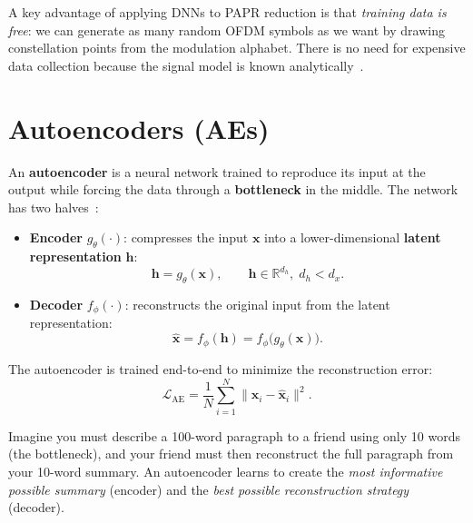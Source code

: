 \begin{keyinsight}
    A key advantage of applying DNNs to PAPR reduction is that
    \emph{training data is free}: we can generate as many random
    OFDM symbols as we want by drawing constellation points from
    the modulation alphabet.  There is no need for expensive data
    collection because the signal model is known analytically~\cite{da2024survey}.
\end{keyinsight}


\section{Autoencoders (AEs)}
\label{sec:autoencoders}

An \textbf{autoencoder} is a neural network trained to reproduce its input
at the output while forcing the data through a \textbf{bottleneck} in the
middle.  The network has two halves~\cite{da2024survey,kim2017novel}:

\begin{itemize}
    \item \textbf{Encoder} $g_\theta(\cdot)$:
          compresses the input $\bm{x}$ into a lower-dimensional
          \textbf{latent representation} $\bm{h}$:
          \begin{equation}
              \bm{h} = g_\theta(\bm{x}),
              \qquad \bm{h} \in \mathbb{R}^{d_h},\; d_h < d_x.
              \label{eq:encoder}
          \end{equation}
    \item \textbf{Decoder} $f_\phi(\cdot)$:
          reconstructs the original input from the latent representation:
          \begin{equation}
              \hat{\bm{x}} = f_\phi(\bm{h}) = f_\phi\bigl(g_\theta(\bm{x})\bigr).
              \label{eq:decoder}
          \end{equation}
\end{itemize}

The autoencoder is trained end-to-end to minimize the reconstruction error:
\begin{equation}
    \mathcal{L}_{\mathrm{AE}} =
    \frac{1}{N}\sum_{i=1}^{N}\bigl\|\bm{x}_i - \hat{\bm{x}}_i\bigr\|^2.
    \label{eq:ae_loss}
\end{equation}

\begin{workingexample}
    Imagine you must describe a 100-word paragraph to a friend using
    only 10 words (the bottleneck), and your friend must then reconstruct
    the full paragraph from your 10-word summary.  An autoencoder learns
    to create the \emph{most informative possible summary} (encoder) and
    the \emph{best possible reconstruction strategy} (decoder).
\end{workingexample}

